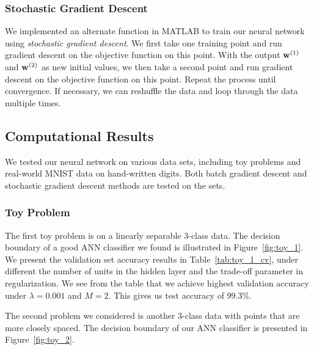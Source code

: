 \subsubsection{Stochastic Gradient Descent}

We implemented an alternate function in MATLAB to train our neural network using \textit{stochastic gradient descent}. We first take one training point and run gradient descent on the objective function on this point. With the output $\boldsymbol{\mathbf{w}}^{(1)}$ and $\boldsymbol{\mathbf{w}}^{(2)}$ as new initial values, we then take a second point and run gradient descent on the objective function on this point. Repeat the process until convergence. If necessary, we can reshuffle the data and loop through the data multiple times.


\subsection{Computational Results}

We tested our neural network on various data sets, including toy problems and real-world MNIST data on hand-written digits. Both batch gradient descent and stochastic gradient descent methods are tested on the sets. 


\subsubsection{Toy Problem}

The first toy problem is on a linearly separable 3-class data. The decision boundary of a good ANN classifier we found is illustrated in Figure~\ref{fig:toy_1}. We present the validation set accuracy results in Table~\ref{tab:toy_1_cv}, under different the number of units in the hidden layer and the trade-off parameter in regularization. We see from the table that we achieve highest validation accuracy under $\lambda = 0.001$ and $M = 2$. This gives us test accuracy of $99.3\%$. 

The second problem we considered is another 3-class data with points that are more closely spaced. The decision boundary of our ANN classifier is presented in Figure~\ref{fig:toy_2}. 


